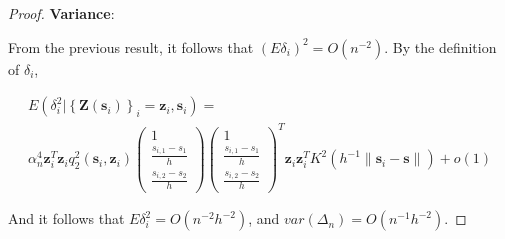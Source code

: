 \documentclass[12pt,english,authoryear, review]{article}\usepackage[]{graphicx}\usepackage[]{color}
\theoremstyle{plain}
\theoremstyle{plain}
\begin{document}
\begin{proof}
\textbf{Variance}:

From the previous result, it follows that $\left(E\delta_{i}\right)^{2}=O\left(n^{-2}\right)$.
By the definition of $\delta_{i}$,

\begin{multline*}
E\left(\delta_{i}^{2}|\left\{ \bm{Z}\left(\bm{s}_{i}\right)\right\} _{i}=\bm{z}_{i},\bm{s}_{i}\right)=\\
\alpha_{n}^{4}\bm{z}_{i}^{T}\bm{z}_{i}q_{2}^{2}\left(\bm{s}_{i},\bm{z}_{i}\right)\left(\begin{array}{c}
1\\
\frac{s_{i,1}-s_{1}}{h}\\
\frac{s_{i,2}-s_{2}}{h}
\end{array}\right)\left(\begin{array}{c}
1\\
\frac{s_{i,1}-s_{1}}{h}\\
\frac{s_{i,2}-s_{2}}{h}
\end{array}\right)^{T}\bm{z}_{i}\bm{z}_{i}^{T}K^{2}\left(h^{-1}\|\bm{s}_{i}-\bm{s}\|\right)+o\left(1\right)
\end{multline*}


And it follows that $E\delta_{i}^{2}=O\left(n^{-2}h^{-2}\right)$,
and $var\left(\Delta_{n}\right)=O\left(n^{-1}h^{-2}\right)$.
\end{proof}


\end{document}
